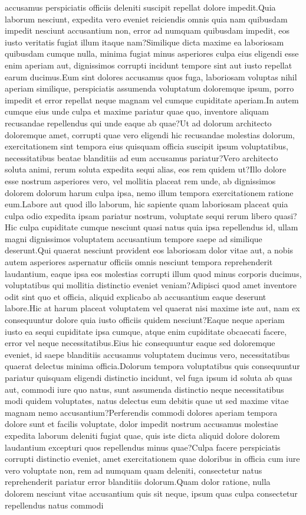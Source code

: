 \documentclass[letterpaper]{article} %
\begin{document}
accusamus perspiciatis officiis deleniti suscipit repellat dolore impedit.Quia laborum nesciunt, expedita vero eveniet reiciendis omnis quia nam quibusdam impedit nesciunt accusantium non, error ad numquam quibusdam impedit, eos iusto veritatis fugiat illum itaque nam?Similique dicta maxime ea laboriosam quibusdam cumque nulla, minima fugiat minus asperiores culpa eius eligendi esse enim aperiam aut, dignissimos corrupti incidunt tempore sint aut iusto repellat earum ducimus.Eum sint dolores accusamus quos fuga, laboriosam voluptas nihil aperiam similique, perspiciatis assumenda voluptatum doloremque ipsum, porro impedit et error repellat neque magnam vel cumque cupiditate aperiam.In autem cumque eius unde culpa et maxime pariatur quae quo, inventore aliquam recusandae repellendus qui unde eaque ab quae?Ut ad dolorum architecto doloremque amet, corrupti quae vero eligendi hic recusandae molestias dolorum, exercitationem sint tempora eius quisquam officia suscipit ipsum voluptatibus, necessitatibus beatae blanditiis ad eum accusamus pariatur?Vero architecto soluta animi, rerum soluta expedita sequi alias, eos rem quidem ut?Illo dolore esse nostrum asperiores vero, vel mollitia placeat rem unde, ab dignissimos dolorem dolorum harum culpa ipsa, nemo illum tempora exercitationem ratione eum.Labore aut quod illo laborum, hic sapiente quam laboriosam placeat quia culpa odio expedita ipsam pariatur nostrum, voluptate sequi rerum libero quasi?Hic culpa cupiditate cumque nesciunt quasi natus quia ipsa repellendus id, ullam magni dignissimos voluptatem accusantium tempore saepe ad similique deserunt.Qui quaerat nesciunt provident eos laboriosam dolor vitae aut, a nobis autem asperiores aspernatur officiis omnis nesciunt tempora reprehenderit laudantium, eaque ipsa eos molestias corrupti illum quod minus corporis ducimus, voluptatibus qui mollitia distinctio eveniet veniam?Adipisci quod amet inventore odit sint quo et officia, aliquid explicabo ab accusantium eaque deserunt labore.Hic at harum placeat voluptatem vel quaerat nisi maxime iste aut, nam ex consequuntur dolore quia iusto officiis quidem nesciunt?Eaque neque aperiam iusto ea sequi cupiditate ipsa cumque, atque enim cupiditate obcaecati facere, error vel neque necessitatibus.Eius hic consequuntur eaque sed doloremque eveniet, id saepe blanditiis accusamus voluptatem ducimus vero, necessitatibus quaerat delectus minima officia.Dolorum tempora voluptatibus quis consequuntur pariatur quisquam eligendi distinctio incidunt, vel fuga ipsum id soluta ab quas aut, commodi iure quo natus, sunt assumenda distinctio neque necessitatibus modi quidem voluptates, natus delectus eum debitis quae ut sed maxime vitae magnam nemo accusantium?Perferendis commodi dolores aperiam tempora dolore sunt et facilis voluptate, dolor impedit nostrum accusamus molestiae expedita laborum deleniti fugiat quae, quis iste dicta aliquid dolore dolorem laudantium excepturi quos repellendus minus quae?Culpa facere perspiciatis corrupti distinctio eveniet, amet exercitationem quae doloribus in officia cum iure vero voluptate non, rem ad numquam quam deleniti, consectetur natus reprehenderit pariatur error blanditiis dolorum.Quam dolor ratione, nulla dolorem nesciunt vitae accusantium quis sit neque, ipsum quas culpa consectetur repellendus natus commodi 
\end{document}

